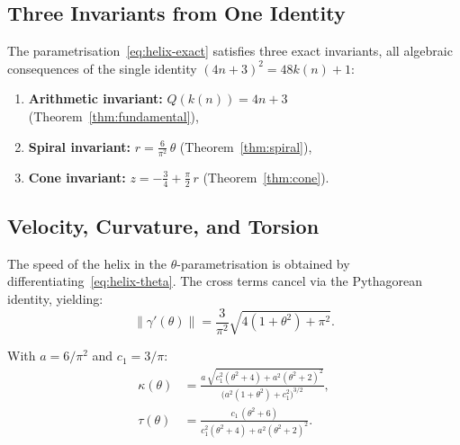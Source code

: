 \subsection{Three Invariants from One Identity}

\begin{tcolorbox}[
  title={Summary: Three simultaneous invariants},
  colback=blue!3,
  colframe=blue!40!black,
  enhanced
]
The parametrisation~\eqref{eq:helix-exact} satisfies three exact
invariants, all algebraic consequences of the single identity
$(4n+3)^2 = 48k(n)+1$:
\begin{enumerate}[label=(\roman*)]
  \item \textbf{Arithmetic invariant:} $Q(k(n)) = 4n+3$
        \quad (Theorem~\ref{thm:fundamental}),
  \item \textbf{Spiral invariant:} $r = \frac{6}{\pi^2}\,\theta$
        \quad (Theorem~\ref{thm:spiral}),
  \item \textbf{Cone invariant:} $z = -\frac{3}{4} + \frac{\pi}{2}\,r$
        \quad (Theorem~\ref{thm:cone}).
\end{enumerate}
\end{tcolorbox}

\subsection{Velocity, Curvature, and Torsion}\label{subsec:curvature}

The speed of the helix in the $\theta$-parametrisation is obtained by
differentiating~\eqref{eq:helix-theta}. The cross terms cancel via the
Pythagorean identity, yielding:
\begin{equation}\label{eq:speed}
  \|\gamma'(\theta)\|
  = \frac{3}{\pi^2}\sqrt{4(1+\theta^2) + \pi^2}.
\end{equation}

\begin{theorem}\label{thm:curvature-torsion}
With $a = 6/\pi^2$ and $c_1 = 3/\pi$:
\begin{align}
  \kappa(\theta)
  &= \frac{a\,\sqrt{c_1^2(\theta^2+4) + a^2(\theta^2+2)^2}}
          {\bigl(a^2(1+\theta^2) + c_1^2\bigr)^{3/2}},
  \label{eq:kappa}\\[6pt]
  \tau(\theta)
  &= \frac{c_1\,(\theta^2 + 6)}
          {c_1^2(\theta^2+4) + a^2(\theta^2+2)^2}.
  \label{eq:tau}
\end{align}
\end{theorem}


